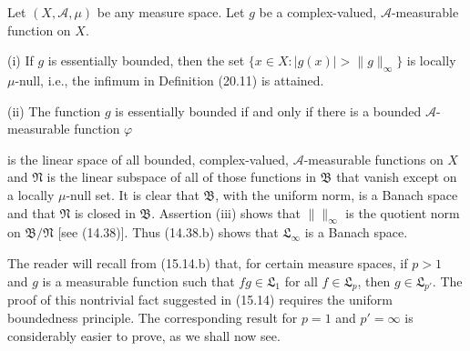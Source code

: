 Let $(X, \mathcal{A}, \mu)$ be any measure space. Let $g$ be a complex-valued, $\mathcal{A}$-measurable function on $X$.

(i) If $g$ is essentially bounded, then the set $\{x \in X : |g(x)| > \|g\|_\infty\}$ is locally $\mu$-null, i.e., the infimum in Definition (20.11) is attained.

(ii) The function $g$ is essentially bounded if and only if there is a bounded $\mathcal{A}$-measurable function $\varphi$

is the linear space of all bounded, complex-valued, $\mathcal{A}$-measurable functions on $X$ and $\mathfrak{N}$ is the linear subspace of all of those functions in $\mathfrak{B}$ that vanish except on a locally $\mu$-null set. It is clear that $\mathfrak{B}$, with the uniform norm, is a Banach space and that $\mathfrak{N}$ is closed in $\mathfrak{B}$. Assertion (iii) shows that $\parallel \parallel_{\infty}$ is the quotient norm on $\mathfrak{B}/\mathfrak{N}$ [see (14.38)]. Thus (14.38.b) shows that $\mathfrak{L}_{\infty}$ is a Banach space.

The reader will recall from (15.14.b) that, for certain measure spaces, if $p > 1$ and $g$ is a measurable function such that $fg \in \mathfrak{L}_1$ for all $f \in \mathfrak{L}_p$, then $g \in \mathfrak{L}_{p'}$. The proof of this nontrivial fact suggested in (15.14) requires the uniform boundedness principle. The corresponding result for $p = 1$ and $p' = \infty$ is considerably easier to prove, as we shall now see.
